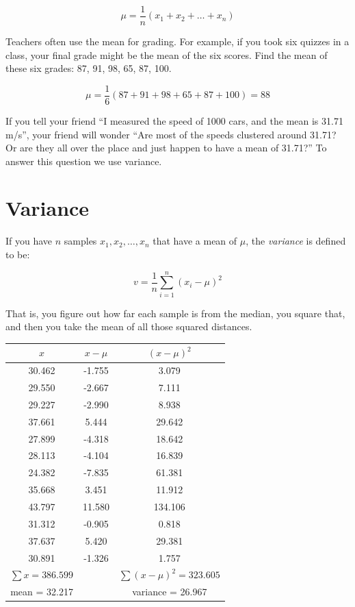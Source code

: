 $$ \mu = \frac{1}{n} \left(x_1 + x_2 + \ldots + x_n\right)$$

\begin{Exercise}[title={Mean Grade}, label=grades_mean]

  Teachers often use the mean for grading.  For example, if you took
  six quizzes in a class, your final grade might be the mean of the six
  scores.  Find the mean of these six grades: 87, 91, 98, 65, 87, 100.

\end{Exercise}
\begin{Answer}[ref=grades_mean]

  $$\mu =\frac{1}{6} \left(87 + 91 + 98 + 65 + 87 + 100 \right) = 88$$

\end{Answer}

If you tell your friend ``I measured the speed of 1000 cars, and the
mean is 31.71 m/s'', your friend will wonder ``Are most of the speeds
clustered around 31.71? Or are they all over the place and just happen
to have a mean of 31.71?'' To answer this question we use variance.

\section{Variance}

If you have $n$ samples $x_1, x_2, \ldots, x_n$ that have a mean of $\mu$, the \textit{variance} is defined to be:

$$v = \frac{1}{n}\sum_{i = 1}^{n} \left(x_i - \mu\right)^2$$

That is, you figure out how far each sample is from the median, you
square that, and then you take the mean of all those squared
distances.

\begin{tabular} {c | c | c}

  $x$ & $x - \mu$ & $(x - \mu)^2$\\
  \hline
30.462 & -1.755 & 3.079 \\
29.550 & -2.667 & 7.111\\
29.227 & -2.990 & 8.938\\
37.661 & 5.444 & 29.642\\
27.899 & -4.318 & 18.642\\
28.113 & -4.104 & 16.839 \\
24.382 & -7.835 & 61.381 \\
35.668 & 3.451 & 11.912 \\
43.797 & 11.580 & 134.106\\
31.312 & -0.905 & 0.818\\
37.637 & 5.420 & 29.381\\
30.891 & -1.326 & 1.757\\
\hline
$\sum x = 386.599$ & & $\sum (x - \mu)^2 = 323.605$\\
mean = 32.217 & & variance = 26.967
\end{tabular}

